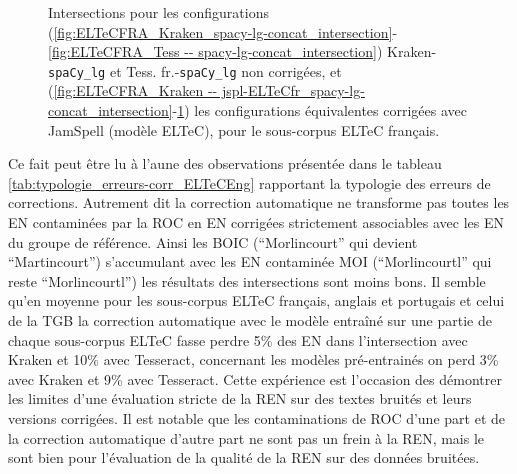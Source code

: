 \begin{figure}[h!]
\begin{minipage}{7cm}
\begin{subfigure}{1\textwidth}
  \label{fig:ELTeCFRA_Tess -- jspl-ELTeCFR_spacy-lg-concat_intersection}
  \end{subfigure}
    \end{minipage}
\caption{Intersections pour les configurations (\ref{fig:ELTeCFRA_Kraken_spacy-lg-concat_intersection}-\ref{fig:ELTeCFRA_Tess -- spacy-lg-concat_intersection}) Kraken-\texttt{spaCy\_lg} et Tess. fr.-\texttt{spaCy\_lg} non corrigées, et (\ref{fig:ELTeCFRA_Kraken -- jspl-ELTeCfr_spacy-lg-concat_intersection}-\ref{fig:ELTeCFRA_Tess -- jspl-ELTeCFR_spacy-lg-concat_intersection}) les configurations équivalentes corrigées avec JamSpell (modèle ELTeC), pour le sous-corpus ELTeC français.}
\label{fig:intersection_globale-kraken}
\end{figure}

Ce fait peut être lu à l'aune %
des observations présentée dans le tableau \ref{tab:typologie_erreurs-corr_ELTeCEng} rapportant la typologie des erreurs de corrections. Autrement dit la correction automatique ne transforme pas toutes les EN contaminées par la ROC en EN corrigées strictement associables avec les EN du groupe de référence. Ainsi les BOIC (``Morlincourt'' qui devient ``Martincourt'') s'accumulant avec les EN contaminée MOI (``Morlincourtl'' qui reste ``Morlincourtl'') les résultats des intersections sont moins bons. Il semble qu'en moyenne pour les sous-corpus ELTeC français, anglais et portugais et celui de la TGB la correction automatique avec le modèle entraîné sur une partie de chaque sous-corpus ELTeC fasse perdre 5\% des EN dans l'intersection avec Kraken et 10\% avec Tesseract, concernant les modèles pré-entrainés on perd 3\% avec Kraken et 9\% avec Tesseract. Cette expérience est l'occasion des démontrer les limites d'une évaluation stricte de la REN sur des textes bruités et leurs versions corrigées. Il est notable que les contaminations de ROC d'une part et de la correction automatique d'autre part ne sont pas un frein à la REN, mais le sont bien pour l'évaluation de la qualité de la REN sur des données bruitées.



